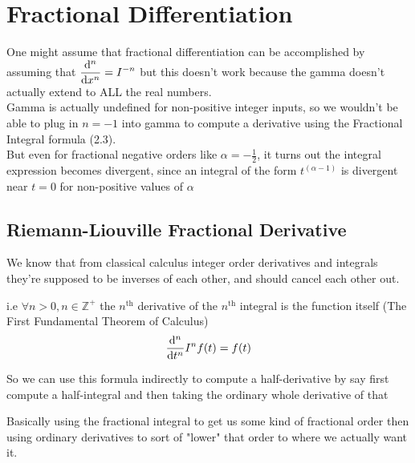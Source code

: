\section{Fractional Differentiation}

One might assume that fractional differentiation can be 
accomplished by assuming that $\displaystyle \dv[n]{}{x} = I^{-n} $
but this doesn't work because the gamma doesn't 
actually extend to ALL the real numbers. 
\\
Gamma is actually undefined for non-positive integer inputs, 
so we wouldn't be able to plug in $n = -1$ into gamma to compute 
a derivative using the Fractional Integral formula (2.3).
\\
But even for fractional negative orders like $\displaystyle \alpha = -\frac{1}{2}$,
it turns out the integral expression becomes 
divergent, since an integral of the form $\displaystyle t^{(\alpha-1)}$ is divergent 
near $t = 0$ for non-positive values of $\alpha$

\subsection{Riemann-Liouville Fractional Derivative}
We know that from classical calculus integer order derivatives 
and integrals they're supposed to be inverses of each other, 
and should cancel each other out.

i.e $\forall n > 0 , n \in \mathbb{Z}^+$ the $ n^{\text{th}} $ derivative of the $ n^{\text{th}} $ integral 
is the function itself (The First Fundamental Theorem of Calculus)
\[
    \dv[n]{}{t} I^{n} f(t) = f(t)    
\]

So we can use this formula indirectly to compute a half-derivative 
by say first compute a half-integral and then taking the 
ordinary whole derivative of that 

Basically using the fractional integral to get us some kind 
of fractional order then using ordinary derivatives to sort 
of "lower" that order to where we actually want it. 

